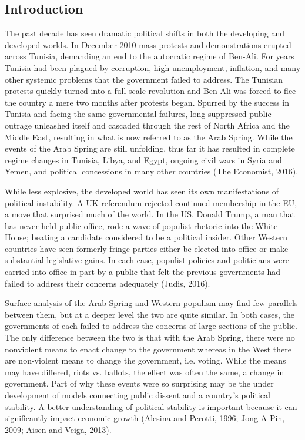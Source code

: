 \documentclass[12pt]{article}
\begin{document}
\begin{spacing}{1.5}


\section{Introduction}

The past decade has seen dramatic political shifts in both the developing and developed worlds. In December 2010 mass protests and demonstrations erupted across Tunisia, demanding an end to the autocratic regime of Ben-Ali. For years Tunisia had been plagued by corruption, high unemployment, inflation, and many other systemic problems that the government failed to address. The Tunisian protests quickly turned into a full scale revolution and Ben-Ali was forced to flee the country a mere two months after protests began. Spurred by the success in Tunisia and facing the same governmental failures, long suppressed public outrage unleashed itself and cascaded through the rest of North Africa and the Middle East, resulting in what is now referred to as the Arab Spring. While the events of the Arab Spring are still unfolding, thus far it has resulted in complete regime changes in Tunisia, Libya, and Egypt, ongoing civil wars in Syria and Yemen, and political concessions in many other countries (The Economist, 2016).  

While less explosive, the developed world has seen its own manifestations of political instability. A UK referendum rejected continued membership in the EU, a move that surprised much of the world. In the US, Donald Trump, a man that has never held public office, rode a wave of populist rhetoric into the White House; beating a candidate considered to be a political insider. Other Western countries have seen formerly fringe parties either be elected into office or make substantial legislative gains. In each case, populist policies and politicians were carried into office in part by a public that felt the previous governments had failed to address their concerns adequately (Judis, 2016).

Surface analysis of the Arab Spring and Western populism may find few parallels between them, but at a deeper level the two are quite similar. In both cases, the governments of each failed to address the concerns of large sections of the public. The only difference between the two is that with the Arab Spring, there were no nonviolent means to enact change to the government whereas in the West there are non-violent means to change the government, i.e. voting. While the means may have differed, riots vs. ballots, the effect was often the same, a change in government. Part of why these events were so surprising may be the under development of models connecting public dissent and a country's political stability. A better understanding of political stability is important because it can significantly impact economic growth (Alesina and Perotti, 1996; Jong-A-Pin, 2009; Aisen and Veiga, 2013). 


\end{spacing}
\end{document}
